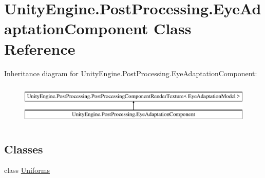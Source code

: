 \hypertarget{class_unity_engine_1_1_post_processing_1_1_eye_adaptation_component}{}\section{Unity\+Engine.\+Post\+Processing.\+Eye\+Adaptation\+Component Class Reference}
\label{class_unity_engine_1_1_post_processing_1_1_eye_adaptation_component}
Inheritance diagram for Unity\+Engine.\+Post\+Processing.\+Eye\+Adaptation\+Component\+:\begin{figure}[H]
\begin{center}
\leavevmode
\includegraphics[height=2.000000cm]{class_unity_engine_1_1_post_processing_1_1_eye_adaptation_component}
\end{center}
\end{figure}
\subsection*{Classes}
\begin{DoxyCompactItemize}
\item 
class \hyperlink{class_unity_engine_1_1_post_processing_1_1_eye_adaptation_component_1_1_uniforms}{Uniforms}
\end{DoxyCompactItemize}
